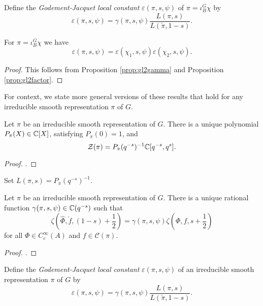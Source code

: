 \begin{defn}
    Define the \textit{Godement-Jacquet local constant} $\varepsilon(\pi,s,\psi)$ of $\pi = \iota_B^G \chi$ by 
    $$\varepsilon(\pi,s,\psi) = \gamma(\pi,s,\psi) \frac{L(\pi,s)}{L(\check{\pi},1-s)}.$$
\end{defn}

\begin{cor}
    For $\pi= \iota_B^G \chi$ we have
    $$\varepsilon(\pi,s,\psi) = \varepsilon(\chi_1,s,\psi)\varepsilon(\chi_2,s,\psi).$$
\end{cor}
\begin{proof}
    This follows from Proposition \ref{prop:gl2gamma} and Proposition \ref{prop:gl2factor}.
\end{proof}

For context, we state more general versions of these results that hold for any irreducible smooth representation $\pi$ of $G$.

\begin{thm}\label{BHThm1}
    Let $\pi$ be an irreducible smooth representation of $G$. There is a unique polynomial $P_\pi(X) \in \mathbb{C}[X]$, satisfying $P_\pi(0)=1$, and 
    $$\mathcal Z(\pi) = P_\pi(q^{-s})^{-1} \mathbb{C}[q^{-s},q^s].$$
\end{thm}
\begin{proof}
    \cite[Theorem 24.2.1]{BH1}.
\end{proof}

\begin{notn}
    Set $L(\pi,s) = P_\pi(q^{-s})^{-1}$.
\end{notn}

\begin{thm}\label{BHThm2}
    Let $\pi$ be an irreducible smooth representation of $G$. There is a unique rational function $\gamma(\pi,s,\psi) \in \mathbb{C}(q^{-s})$ such that 
    $$\zeta\left(\hat\Phi,\check{f},(1-s)+\frac{1}{2}\right) = \gamma(\pi,s,\psi) \zeta\left(\Phi,f,s+\frac{1}{2}\right)$$ for all $\Phi \in C_c^\infty(A)$ and $f \in \mathcal C(\pi)$.
\end{thm}
\begin{proof}
    \cite[Theorem 24.2.2]{BH1}.
\end{proof}

\begin{defn}
    Define the \textit{Godement-Jacquet local constant} $\varepsilon(\pi,s,\psi)$ of an irreducible smooth representation $\pi$ of $G$ by 
    $$\varepsilon(\pi,s,\psi) = \gamma(\pi,s,\psi) \frac{L(\pi,s)}{L(\check{\pi},1-s)}.$$
\end{defn}

